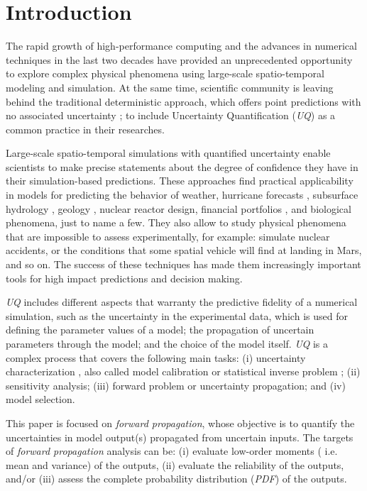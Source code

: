 \chapter[Introduction]{Introduction}\label{cap:intro}
The rapid growth of high-performance computing and the advances in numerical techniques in the last two decades have provided an unprecedented opportunity to explore complex physical phenomena using large-scale spatio-temporal modeling and simulation.  At the same time, scientific community is leaving behind the traditional deterministic approach, which offers  point predictions with no associated uncertainty \cite{Johnstone2015};  to include Uncertainty Quantification (\textit{UQ}) as a common practice in their researches. 

Large-scale spatio-temporal simulations with quantified uncertainty enable scientists to make precise statements about the degree of confidence they have in their simulation-based predictions. These approaches find practical applicability in models for predicting the behavior of weather, hurricane forecasts \cite{Tobergte2013}, subsurface hydrology \cite{Baroni2014a}, geology \cite{Guerra2016}, nuclear reactor design, financial portfolios \cite{Chen2008}, and biological phenomena, just to name a few. They also allow to study physical phenomena that are impossible to assess experimentally, for example: simulate nuclear accidents, or the conditions that some spatial vehicle will find at landing in Mars, and so on. The success of these techniques has made them increasingly important tools for high impact predictions and decision making.

\textit{UQ}  includes different aspects that warranty the predictive fidelity of a numerical simulation, such as the uncertainty in the experimental data, which is used for defining the parameter values of a model; the propagation of uncertain  parameters through the model; and the choice of the model itself. \textit{UQ} is a complex process that covers the following main tasks: (i) uncertainty characterization \cite{Crespo2014}, also called model calibration \cite{Farrell2015a} or statistical inverse problem \cite{Estacio-Hiroms2012};  (ii) sensitivity analysis; (iii) forward problem or uncertainty propagation; and (iv) model selection.

This paper is focused on  \textit{forward propagation}, whose objective is to quantify the uncertainties in model output(s) propagated from uncertain inputs. The targets of \textit{forward propagation} analysis can be: (i) evaluate low-order moments ( i.e. mean and variance) of the outputs, (ii) evaluate the reliability of the outputs, and/or (iii) assess the complete probability distribution (\textit{PDF}) of the outputs.

